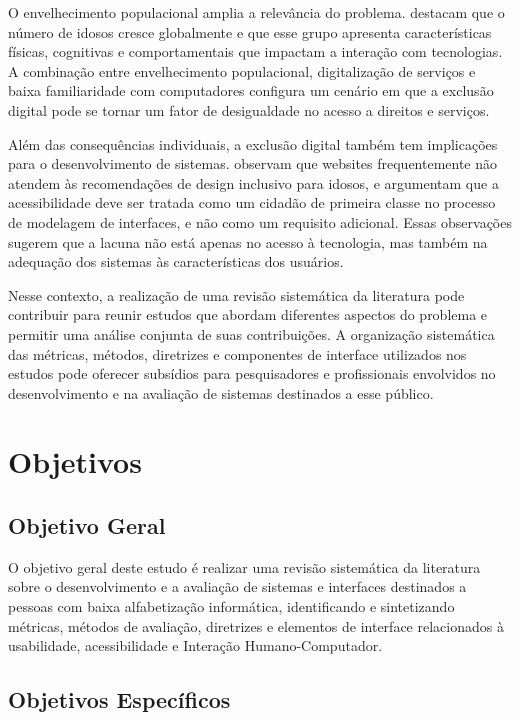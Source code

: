 O envelhecimento populacional amplia a relevância do problema. \cite{ahmad2013teaching} destacam que o número de idosos cresce globalmente e que esse grupo apresenta características físicas, cognitivas e comportamentais que impactam a interação com tecnologias. A combinação entre envelhecimento populacional, digitalização de serviços e baixa familiaridade com computadores configura um cenário em que a exclusão digital pode se tornar um fator de desigualdade no acesso a direitos e serviços.

Além das consequências individuais, a exclusão digital também tem implicações para o desenvolvimento de sistemas. \cite{dombrovskaia2021guideline} observam que websites frequentemente não atendem às recomendações de design inclusivo para idosos, e \cite{wickramathilaka2023addressing} argumentam que a acessibilidade deve ser tratada como um cidadão de primeira classe no processo de modelagem de interfaces, e não como um requisito adicional. Essas observações sugerem que a lacuna não está apenas no acesso à tecnologia, mas também na adequação dos sistemas às características dos usuários.

Nesse contexto, a realização de uma revisão sistemática da literatura pode contribuir para reunir estudos que abordam diferentes aspectos do problema e permitir uma análise conjunta de suas contribuições. A organização sistemática das métricas, métodos, diretrizes e componentes de interface utilizados nos estudos pode oferecer subsídios para pesquisadores e profissionais envolvidos no desenvolvimento e na avaliação de sistemas destinados a esse público.

\section{Objetivos}

\subsection{Objetivo Geral}

O objetivo geral deste estudo é realizar uma revisão sistemática da literatura sobre o desenvolvimento e a avaliação de sistemas e interfaces destinados a pessoas com baixa alfabetização informática, identificando e sintetizando métricas, métodos de avaliação, diretrizes e elementos de interface relacionados à usabilidade, acessibilidade e Interação Humano-Computador.

\subsection{Objetivos Específicos}


